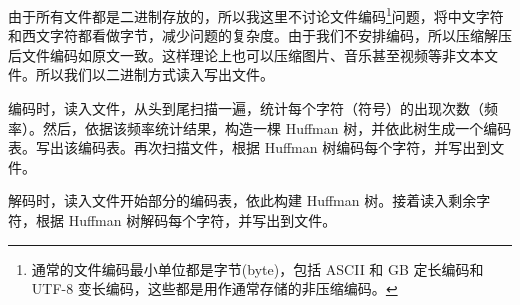 由于所有文件都是二进制存放的，所以我这里不讨论文件编码\footnote{通常的文件编码最小单位都是字节(byte)，包括 ASCII 和 GB 定长编码和 UTF-8 变长编码，这些都是用作通常存储的非压缩编码。}问题，将中文字符和西文字符都看做字节，减少问题的复杂度。由于我们不安排编码，所以压缩解压后文件编码如原文一致。这样理论上也可以压缩图片、音乐甚至视频等非文本文件。所以我们以二进制方式读入写出文件。

编码时，读入文件，从头到尾扫描一遍，统计每个字符（符号）的出现次数（频率）。然后，依据该频率统计结果，构造一棵 Huffman 树，并依此树生成一个编码表。写出该编码表。再次扫描文件，根据 Huffman 树编码每个字符，并写出到文件。

解码时，读入文件开始部分的编码表，依此构建 Huffman 树。接着读入剩余字符，根据 Huffman 树解码每个字符，并写出到文件。
